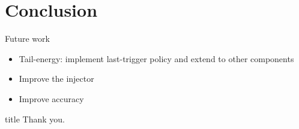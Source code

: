 \section{Conclusion}
\begin{frame}{Future work}
\begin{itemize}
\item Tail-energy: implement last-trigger policy and extend to other components
\item Improve the injector
\item Improve accuracy
\end{itemize}
\end{frame}
%
%
\begin{frame}
  \vfill
  \centering
  \begin{beamercolorbox}[sep=8pt,center,shadow=true,rounded=true]{title}
    Thank you.\par%
  \end{beamercolorbox}
  \vfill
\end{frame}
%
%
